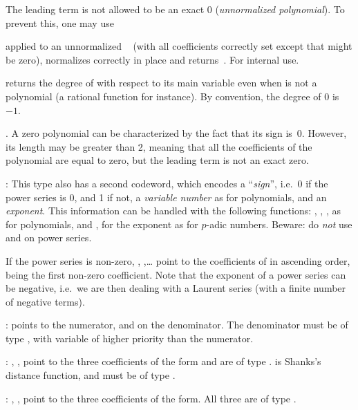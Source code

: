 The leading term is not allowed to be an exact $0$ (\emph{unnormalized
polynomial}). To prevent this, one may use

 applied to an unnormalized ~
(with all coefficients correctly set except that  might
be zero), normalizes  correctly in place and returns~. For
internal use.

 returns the degree of  with respect to its
main variable even when  is not a polynomial (a rational function for
instance). By convention, the degree of $0$ is~$-1$.

. A zero polynomial can be characterized by the
fact that its sign is~0. However, its length may be greater than 2, meaning
that all the coefficients of the polynomial are equal to zero, but the
leading term  is not an exact zero.

:
This type also has a second codeword, which encodes a ``\emph{sign}'', i.e.~0
if the power series is 0, and 1 if not, a \emph{variable number} as for
polynomials, and an \emph{exponent}. This information can be handled with the
following functions: , , , 
as for polynomials, and ,  for the exponent as for
$p$-adic numbers. Beware: do \emph{not} use  and  on
power series.

If the power series is non-zero, , ,\dots
{} point to the coefficients of  in ascending order,
 being the first non-zero coefficient. Note that the exponent of a
power series can be negative, i.e.~we are then dealing with a Laurent series
(with a finite number of negative terms).

:%
  points to the numerator,
and  on the denominator. The denominator must be of type ,
with variable of higher priority than the numerator.

:%
 ,
,  point to the three coefficients of the form and are of
type .  is Shanks's distance function, and must be of type
.

:%
 , ,
 point to the three coefficients of the form. All three are of type
.

